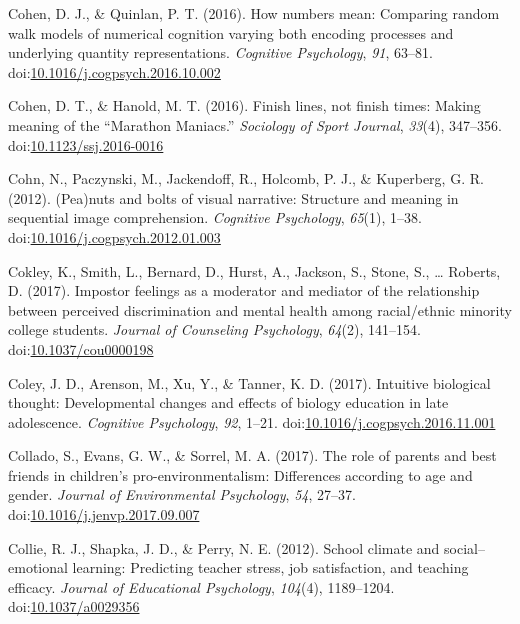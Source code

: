 \documentclass[english,man]{apa6}
\begin{document}
\hypertarget{ref-Cohen2016}{}
Cohen, D. J., \& Quinlan, P. T. (2016). How numbers mean: Comparing
random walk models of numerical cognition varying both encoding
processes and underlying quantity representations. \emph{Cognitive
Psychology}, \emph{91}, 63--81.
doi:\href{https://doi.org/10.1016/j.cogpsych.2016.10.002}{10.1016/j.cogpsych.2016.10.002}

\hypertarget{ref-Cohen2016a}{}
Cohen, D. T., \& Hanold, M. T. (2016). Finish lines, not finish times:
Making meaning of the ``Marathon Maniacs.'' \emph{Sociology of Sport
Journal}, \emph{33}(4), 347--356.
doi:\href{https://doi.org/10.1123/ssj.2016-0016}{10.1123/ssj.2016-0016}

\hypertarget{ref-Cohn2012}{}
Cohn, N., Paczynski, M., Jackendoff, R., Holcomb, P. J., \& Kuperberg,
G. R. (2012). (Pea)nuts and bolts of visual narrative: Structure and
meaning in sequential image comprehension. \emph{Cognitive Psychology},
\emph{65}(1), 1--38.
doi:\href{https://doi.org/10.1016/j.cogpsych.2012.01.003}{10.1016/j.cogpsych.2012.01.003}

\hypertarget{ref-Cokley2017}{}
Cokley, K., Smith, L., Bernard, D., Hurst, A., Jackson, S., Stone, S.,
\ldots{} Roberts, D. (2017). Impostor feelings as a moderator and
mediator of the relationship between perceived discrimination and mental
health among racial/ethnic minority college students. \emph{Journal of
Counseling Psychology}, \emph{64}(2), 141--154.
doi:\href{https://doi.org/10.1037/cou0000198}{10.1037/cou0000198}

\hypertarget{ref-Coley2017}{}
Coley, J. D., Arenson, M., Xu, Y., \& Tanner, K. D. (2017). Intuitive
biological thought: Developmental changes and effects of biology
education in late adolescence. \emph{Cognitive Psychology}, \emph{92},
1--21.
doi:\href{https://doi.org/10.1016/j.cogpsych.2016.11.001}{10.1016/j.cogpsych.2016.11.001}

\hypertarget{ref-Collado2017}{}
Collado, S., Evans, G. W., \& Sorrel, M. A. (2017). The role of parents
and best friends in children's pro-environmentalism: Differences
according to age and gender. \emph{Journal of Environmental Psychology},
\emph{54}, 27--37.
doi:\href{https://doi.org/10.1016/j.jenvp.2017.09.007}{10.1016/j.jenvp.2017.09.007}

\hypertarget{ref-Collie2012}{}
Collie, R. J., Shapka, J. D., \& Perry, N. E. (2012). School climate and
social--emotional learning: Predicting teacher stress, job satisfaction,
and teaching efficacy. \emph{Journal of Educational Psychology},
\emph{104}(4), 1189--1204.
doi:\href{https://doi.org/10.1037/a0029356}{10.1037/a0029356}
\end{document}
